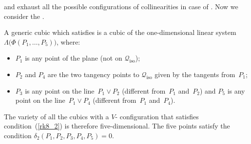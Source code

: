\documentclass[a4paper, 11pt, reqno]{amsart}
\theoremstyle{plain}
\theoremstyle{definition}
\newcommand{\iso}{\mathcal{Q}_{\mathrm{iso}}}
\begin{document}
 and  exhaust all the possible configurations
of collinearities in case of .
Now we consider the .

%
A generic cubic which satisfies  is
a cubic of the one-dimensional linear system
$\Lambda\bigl(\Phi(P_1, \dotsc, P_5)\bigr)$, where:
%
\begin{itemize}
  \item $P_1$ is any point of the plane (not on $\iso$);
  \item $P_2$ and $P_4$ are the two tangency points to $\iso$ given by the tangents from~$P_1$;
  \item $P_3$ is any point on the line~$P_1 \vee P_2$ (different from~$P_1$ and~$P_2$)
  and $P_5$ is any point on the line~$P_1 \vee P_4$ (different from~$P_1$ and~$P_4$).
\end{itemize}
%
The variety of all the cubics with a $V$- configuration
that satisfies condition~(\ref{rk8_2}) is therefore five-dimensional.
The five points satisfy the condition $\delta_2(P_1, P_2, P_3, P_4, P_5) = 0$.
\end{document}
